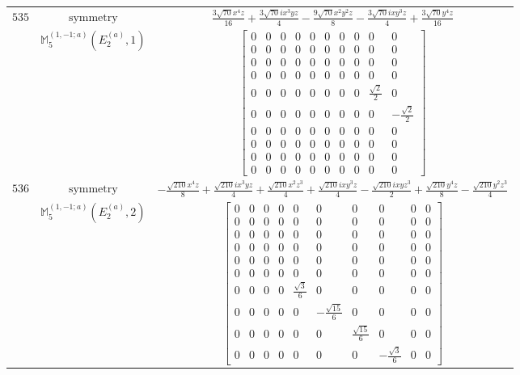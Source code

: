 \documentclass[fleqn,8pt,landscape]{jsarticle}
\begin{document}
\begin{longtable}{ccc}
$ 535 $ & $ \text{symmetry} $ & $ \frac{3 \sqrt{70} x^{4} z}{16} + \frac{3 \sqrt{70} i x^{3} y z}{4} - \frac{9 \sqrt{70} x^{2} y^{2} z}{8} - \frac{3 \sqrt{70} i x y^{3} z}{4} + \frac{3 \sqrt{70} y^{4} z}{16} $ \\
$  $ & $ \mathbb{M}_{5}^{(1,-1;a)}(E_{2}^{(a)},1) $ & $ \begin{bmatrix} 0 & 0 & 0 & 0 & 0 & 0 & 0 & 0 & 0 & 0 \\ 0 & 0 & 0 & 0 & 0 & 0 & 0 & 0 & 0 & 0 \\ 0 & 0 & 0 & 0 & 0 & 0 & 0 & 0 & 0 & 0 \\ 0 & 0 & 0 & 0 & 0 & 0 & 0 & 0 & 0 & 0 \\ 0 & 0 & 0 & 0 & 0 & 0 & 0 & 0 & \frac{\sqrt{2}}{2} & 0 \\ 0 & 0 & 0 & 0 & 0 & 0 & 0 & 0 & 0 & - \frac{\sqrt{2}}{2} \\ 0 & 0 & 0 & 0 & 0 & 0 & 0 & 0 & 0 & 0 \\ 0 & 0 & 0 & 0 & 0 & 0 & 0 & 0 & 0 & 0 \\ 0 & 0 & 0 & 0 & 0 & 0 & 0 & 0 & 0 & 0 \\ 0 & 0 & 0 & 0 & 0 & 0 & 0 & 0 & 0 & 0 \end{bmatrix} $ \\ \hline
$ 536 $ & $ \text{symmetry} $ & $ - \frac{\sqrt{210} x^{4} z}{8} + \frac{\sqrt{210} i x^{3} y z}{4} + \frac{\sqrt{210} x^{2} z^{3}}{4} + \frac{\sqrt{210} i x y^{3} z}{4} - \frac{\sqrt{210} i x y z^{3}}{2} + \frac{\sqrt{210} y^{4} z}{8} - \frac{\sqrt{210} y^{2} z^{3}}{4} $ \\
$  $ & $ \mathbb{M}_{5}^{(1,-1;a)}(E_{2}^{(a)},2) $ & $ \begin{bmatrix} 0 & 0 & 0 & 0 & 0 & 0 & 0 & 0 & 0 & 0 \\ 0 & 0 & 0 & 0 & 0 & 0 & 0 & 0 & 0 & 0 \\ 0 & 0 & 0 & 0 & 0 & 0 & 0 & 0 & 0 & 0 \\ 0 & 0 & 0 & 0 & 0 & 0 & 0 & 0 & 0 & 0 \\ 0 & 0 & 0 & 0 & 0 & 0 & 0 & 0 & 0 & 0 \\ 0 & 0 & 0 & 0 & 0 & 0 & 0 & 0 & 0 & 0 \\ 0 & 0 & 0 & 0 & \frac{\sqrt{3}}{6} & 0 & 0 & 0 & 0 & 0 \\ 0 & 0 & 0 & 0 & 0 & - \frac{\sqrt{15}}{6} & 0 & 0 & 0 & 0 \\ 0 & 0 & 0 & 0 & 0 & 0 & \frac{\sqrt{15}}{6} & 0 & 0 & 0 \\ 0 & 0 & 0 & 0 & 0 & 0 & 0 & - \frac{\sqrt{3}}{6} & 0 & 0 \end{bmatrix} $ \\ \hline

\end{longtable}
\end{document}

